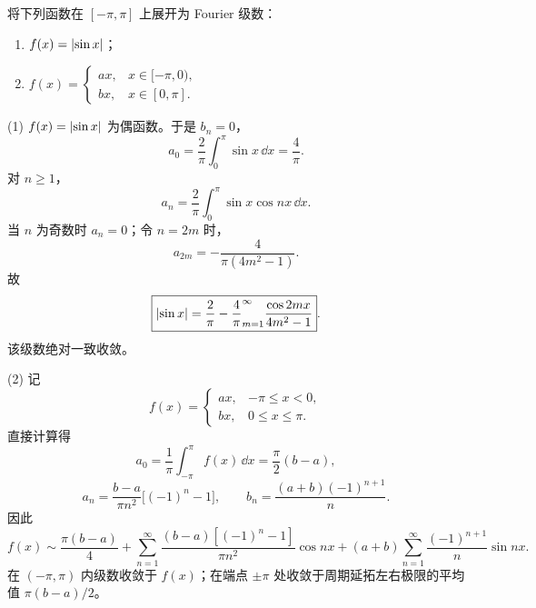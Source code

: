 \begin{xexercise}[4]
将下列函数在 $[-\pi,\pi]$ 上展开为 Fourier 级数：
  \begin{enumerate}[label=(\arabic*)]
    \item $f(x)=\lvert\sin x\rvert$；
    \item $f(x)=\begin{cases}ax,&x\in[-\pi,0),\\ bx,&x\in[0,\pi].\end{cases}$
  \end{enumerate}
\end{xexercise}
\begin{xsolution}
(1) $f(x)=\lvert\sin x\rvert$ 为偶函数。于是 $b_n=0$，
\[
  a_0=\frac2\pi\int_0^\pi\sin x\,\dd x=\frac4\pi.
\]
对 $n\ge1$，
\[
  a_n=\frac2\pi\int_0^\pi\sin x\cos nx\,\dd x.
\]
当 $n$ 为奇数时 $a_n=0$；令 $n=2m$ 时，
\[
  a_{2m}=-\frac4{\pi(4m^2-1)}.
\]
故
\[
  \boxed{\displaystyle
  \lvert\sin x\rvert=\frac{2}{\pi}-
  \frac{4}{\pi}
  \relax_{m=1}^{\infty}\frac{\cos2mx}{4m^2-1}}.
\]
该级数绝对一致收敛。

(2) 记
\[
  f(x)=\begin{cases}ax,&-\pi\le x<0,\\ bx,&0\le x\le\pi.\end{cases}
\]
直接计算得
\[
  a_0=\frac1\pi\int_{-\pi}^{\pi}f(x)\,\dd x
  =\frac\pi2(b-a),
\]
\[
  a_n=\frac{b-a}{\pi n^2}\bigl[(-1)^n-1\bigr],
\qquad
  b_n=\frac{(a+b)(-1)^{n+1}}n.
\]
因此
\[
  \boxed{\displaystyle
  f(x)\sim\frac{\pi(b-a)}4
  +\sum_{n=1}^{\infty}
   \frac{(b-a)[(-1)^n-1]}{\pi n^2}\cos nx
  +(a+b)\sum_{n=1}^{\infty}\frac{(-1)^{n+1}}n\sin nx }.
\]
在 $(-\pi,\pi)$ 内级数收敛于 $f(x)$；在端点 $\pm\pi$ 处收敛于周期延拓左右极限的平均值
$\pi(b-a)/2$。
\end{xsolution}


